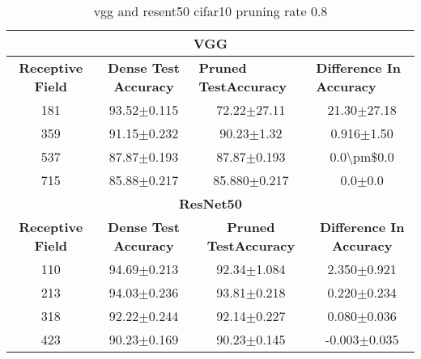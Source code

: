 \begin{table}[H]
\begin{tabular}{@{}cccc@{}}
\toprule
\multicolumn{4}{c}{\textbf{VGG}}                                                                                                                                  \\ \midrule
\textbf{Receptive Field} & \textbf{Dense Test Accuracy} & \multicolumn{1}{l}{\textbf{Pruned  TestAccuracy}} & \multicolumn{1}{l}{\textbf{Difference In Accuracy}} \\ \midrule
181                      & 93.52$\pm$0.115              & 72.22$\pm$27.11                                   & 21.30$\pm$27.18                                     \\
359                      & 91.15$\pm$0.232              & 90.23$\pm$1.32                                    & 0.916$\pm$1.50                                      \\
537                      & 87.87$\pm$0.193              & 87.87$\pm$0.193                                   & 0.0\textbackslash{}pm\$0.0                          \\
715                      & 85.88$\pm$0.217              & 85.880$\pm$0.217                                  & 0.0$\pm$0.0                                         \\ \midrule
\multicolumn{4}{c}{\textbf{ResNet50}}                                                                                                                             \\ \midrule
\textbf{Receptive Field} & \textbf{Dense Test Accuracy} & \textbf{Pruned  TestAccuracy}                     & \textbf{Difference In Accuracy}                     \\
110                      & 94.69$\pm$0.213              & 92.34$\pm$1.084                                   & 2.350$\pm$0.921                                     \\
213                      & 94.03$\pm$0.236              & 93.81$\pm$0.218                                   & 0.220$\pm$0.234                                     \\
318                      & 92.22$\pm$0.244              & 92.14$\pm$0.227                                   & 0.080$\pm$0.036                                     \\
423                      & 90.23$\pm$0.169              & 90.23$\pm$0.145                                   & -0.003$\pm$0.035                                    \\ \bottomrule
\end{tabular}
\caption{vgg and resent50 cifar10 pruning rate 0.8}
\label{tab:cifar10 pruning rate08}
\end{table}

